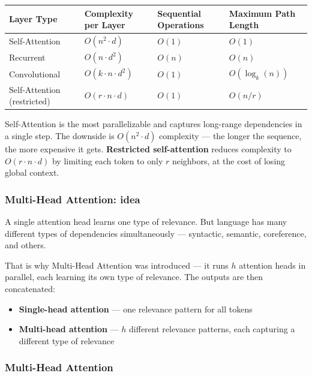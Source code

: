 \documentclass[10pt]{article}
\begin{document}
\begin{center}
\renewcommand{\arraystretch}{1.5}
\begin{tabular}{|m{4.5cm}|m{3cm}|m{3cm}|m{3cm}|}
\hline
\rule{0pt}{10pt}\textbf{Layer Type} & \textbf{Complexity per Layer} & \textbf{Sequential Operations} & \textbf{Maximum Path Length} \\
\hline
\rule{0pt}{8pt}Self-Attention & $O(n^{2} \cdot d)$ & $O(1)$ & $O(1)$ \\
\hline
Recurrent & $O(n \cdot d^{2})$ & $O(n)$ & $O(n)$ \\
\hline
Convolutional & $O(k \cdot n \cdot d^{2})$ & $O(1)$ & $O(\log_{k}(n))$ \\
\hline
Self-Attention (restricted) & $O(r \cdot n \cdot d)$ & $O(1)$ & $O(n/r)$ \\
\hline
\end{tabular}
\end{center}
Self-Attention is the most parallelizable and captures long-range dependencies in a single step. The downside is $O(n^2 \cdot d)$ complexity --- the longer
the sequence, the more expensive it gets. \textbf{Restricted self-attention} reduces complexity to $O(r \cdot n \cdot d)$ by limiting each token to only $r$ neighbors, at the cost of losing global context.


\subsubsection{Multi-Head Attention: idea}

A single attention head learns one type of relevance.
But language has many different types of dependencies simultaneously ---
syntactic, semantic, coreference, and others.

That is why Multi-Head Attention was introduced --- it runs $h$ attention heads in parallel, each learning its own type of relevance. The outputs are then concatenated:

\begin{itemize}
    \item \textbf{Single-head attention} --- one relevance pattern for all tokens
    \item \textbf{Multi-head attention} --- $h$ different relevance patterns,
    each capturing a different type of relevance
\end{itemize}


\subsubsection{Multi-Head Attention}
\end{document}
